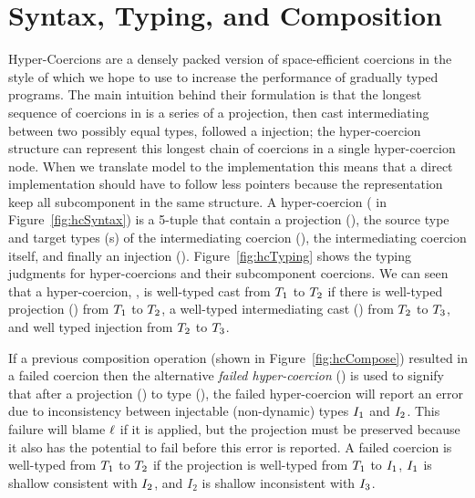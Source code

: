 \documentclass[acmtog, authorversion, acmlarge]{acmart}
\begin{document}
\newcommand{\cmp}[2]{\ensuremath{#1 \fatsemi #2}}
\newcommand{\cmpm}[2]{\cmp{#1}{#2}}

\newcommand{\depth}[1]{\ensuremath{\mid #1 \mid}}
\newcommand{\Max}[1]{\ensuremath{\texttt{max}(#1)}}

\newcommand{\interp}[3]{%
  \ensuremath{\llbracket #1 \rrbracket_{#3}^{#2}}}

\newcommand{\interpm}[3]{%
  \ensuremath{\llbracket \overline{#1} \rrbracket_{#3}^{#2}}}


\section{Syntax, Typing, and Composition}
\label{sec:hc}

Hyper-Coercions are a densely packed version of space-efficient
coercions in the style of \citet{Siek:2015ab} which we hope to use to
increase the performance of gradually typed programs. 
%
The main intuition behind their formulation is that the longest
sequence of coercions in \citet{Siek:2015ab} is a series of a
projection, then cast intermediating between two possibly equal types,
followed a injection; the hyper-coercion structure can represent this
longest chain of coercions in a single hyper-coercion node.
%
When we translate model to the implementation this means that a direct
implementation should have to follow less pointers because the
representation keep all subcomponent in the same structure.
%
A hyper-coercion (\HC \; in
Figure~\ref{fig:hcSyntax}) is a 5-tuple that contain a projection
(\Prj), the source type and target types (\T{}s) of the intermediating
coercion (\Med), the intermediating coercion itself, and finally an
injection (\Inj). Figure~\ref{fig:hcTyping} shows the typing judgments
for hyper-coercions and their subcomponent coercions.  We can seen
that a hyper-coercion, , is
well-typed cast from $T_1$ to $T_2$ if there is well-typed
projection (\Prj) from $T_1$ to $T_2$, a well-typed intermediating
cast (\Med) from $T_2$ to $T_3$, and well typed injection from
$T_2$ to $T_3$.

If a previous composition operation (shown in
Figure~\ref{fig:hcCompose}) resulted in a failed coercion then the
alternative \emph{failed hyper-coercion}
() is used to signify that
after a projection (\Prj) to type (\T), the failed hyper-coercion will
report an error due to inconsistency between injectable (non-dynamic)
types $I_1$ and $I_2$. This failure will blame $\ell$ if it is applied,
but the projection must be preserved because it also has the
potential to fail before
this error is reported. A failed coercion is well-typed from $T_1$ to
$T_2$ if the projection is well-typed from $T_1$ to $I_1$, $I_1$
is shallow consistent with $I_2$, and $I_2$ is shallow inconsistent
with $I_3$.
\end{document}
